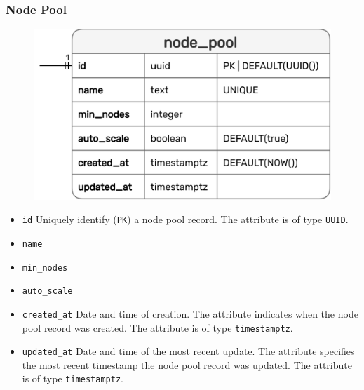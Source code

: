 \subsubsection{Node Pool}
\label{subsubsec:implementation_server_database_node_pool}

\begin{figure}
  \centering
  \includegraphics[width=\linewidth]{images/implementation/erm_node_pool.png}
\end{figure}

\begin{itemize}
  \item \texttt{id}
    \newline
    Uniquely identify (\texttt{PK}) a node pool record.
    \newline
    The attribute is of type \texttt{UUID}.

  \item \texttt{name}
    \newline

  \item \texttt{min\_nodes}
    \newline

  \item \texttt{auto\_scale}
    \newline

  \item \texttt{created\_at}
    \newline
    Date and time of creation.
    \newline
    The attribute indicates when the node pool record was created.
    \newline
    The attribute is of type \texttt{timestamptz}.

  \item \texttt{updated\_at}
    \newline
    Date and time of the most recent update.
    \newline
    The attribute specifies the most recent timestamp the node pool record was updated.
    \newline
    The attribute is of type \texttt{timestamptz}.
\end{itemize}

